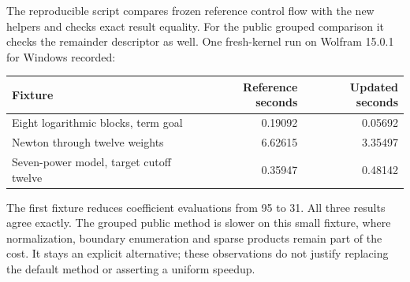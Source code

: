 The reproducible script  compares frozen
reference control flow with the new helpers and checks exact result equality.
For the public grouped comparison it checks the remainder descriptor as well.
One fresh-kernel run on Wolfram 15.0.1 for Windows recorded:
\begin{center}
\begin{tabular}{@{}lrr@{}}
\toprule
Fixture & Reference seconds & Updated seconds\\
\midrule
Eight logarithmic blocks, term goal & 0.19092 & 0.05692\\
Newton through twelve weights & 6.62615 & 3.35497\\
Seven-power model, target cutoff twelve & 0.35947 & 0.48142\\
\bottomrule
\end{tabular}
\end{center}
The first fixture reduces coefficient evaluations from 95 to 31. All three
results agree exactly. The grouped public method is slower on this small
fixture, where normalization, boundary enumeration and sparse products remain
part of the cost. It stays an explicit alternative; these observations do not
justify replacing the default method or asserting a uniform speedup.
